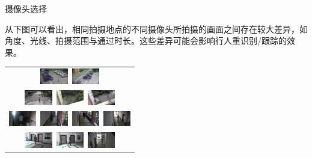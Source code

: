 \begin{frame}{摄像头选择}
\begin{block}{}
    从下图可以看出，相同拍摄地点的不同摄像头所拍摄的画面之间存在较大差异，如角度、光线、拍摄范围与通过时长。这些差异可能会影响行人重识别/跟踪的效果。
\end{block}
\begin{table}
    \centering
    \begin{tabular}{c}
        \includegraphics[width=12mm]{figures/1-1}~\includegraphics[width=12mm]{figures/1-2} \\
        \includegraphics[width=12mm]{figures/1-4}~\includegraphics[width=12mm]{figures/1-5}~\includegraphics[width=12mm]{figures/1-6} \\
        \includegraphics[width=12mm]{figures/2-1}~\includegraphics[width=12mm]{figures/2-2}~\includegraphics[width=12mm]{figures/2-3}~\includegraphics[width=12mm]{figures/2-4} \\
        \includegraphics[width=12mm]{figures/3-1}~\includegraphics[width=12mm]{figures/3-2}~\includegraphics[width=12mm]{figures/3-3} \\

\end{tabular}
\end{table}
\end{frame}
